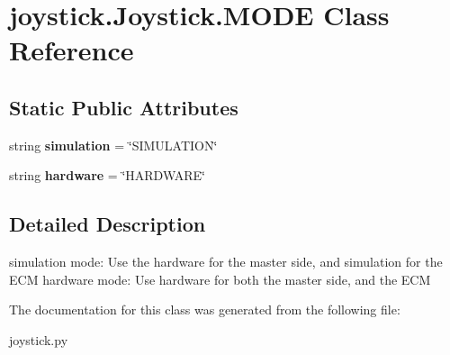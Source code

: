 \hypertarget{classjoystick_1_1Joystick_1_1MODE}{\section{joystick.\-Joystick.\-M\-O\-D\-E Class Reference}
\label{classjoystick_1_1Joystick_1_1MODE}
}
\subsection*{Static Public Attributes}
\begin{DoxyCompactItemize}
\item 
\hypertarget{classjoystick_1_1Joystick_1_1MODE_a3b7c644e67c3db15dd2c665d231c5def}{string {\bfseries simulation} = \char`\"{}S\-I\-M\-U\-L\-A\-T\-I\-O\-N\char`\"{}}\label{classjoystick_1_1Joystick_1_1MODE_a3b7c644e67c3db15dd2c665d231c5def}

\item 
\hypertarget{classjoystick_1_1Joystick_1_1MODE_a4dc5d894100044c1eaad414a3ec9462f}{string {\bfseries hardware} = \char`\"{}H\-A\-R\-D\-W\-A\-R\-E\char`\"{}}\label{classjoystick_1_1Joystick_1_1MODE_a4dc5d894100044c1eaad414a3ec9462f}

\end{DoxyCompactItemize}


\subsection{Detailed Description}
\begin{DoxyVerb}    simulation mode: Use the hardware for the master side, 
            and simulation for the ECM
    hardware mode: Use hardware for both the master side,
            and the ECM
\end{DoxyVerb}
 

The documentation for this class was generated from the following file\-:\begin{DoxyCompactItemize}
\item 
joystick.\-py\end{DoxyCompactItemize}
